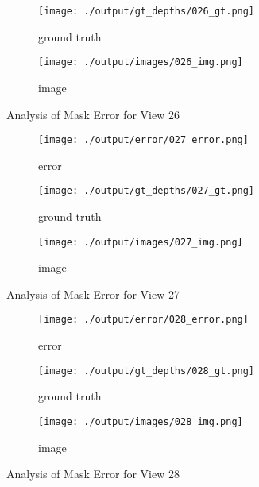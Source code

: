 \documentclass{article}
\begin{document}
\begin{figure}
\begin{subfigure}{0.3\textwidth}
		\centering
		\texttt{[image: ./output/gt\_depths/026\_gt.png]}
		\caption{ground truth}
		\label{fig:gt26}
	\end{subfigure}
	\hfill
	\centering
	\begin{subfigure}{0.3\textwidth}
		\centering
		\texttt{[image: ./output/images/026\_img.png]}
		\caption{image}
		\label{fig:img26}
	\end{subfigure}
	\hfill
	\caption{Analysis of Mask Error for View 26}
	\label{fig:error_analys26}
\end{figure}\begin{figure}
	\centering
	\begin{subfigure}{0.3\textwidth}
		\centering
		\texttt{[image: ./output/error/027\_error.png]}
		\caption{error}
		\label{fig:error27}
	\end{subfigure}
	\hfill
	\centering
	\begin{subfigure}{0.3\textwidth}
		\centering
		\texttt{[image: ./output/gt\_depths/027\_gt.png]}
		\caption{ground truth}
		\label{fig:gt27}
	\end{subfigure}
	\hfill
	\centering
	\begin{subfigure}{0.3\textwidth}
		\centering
		\texttt{[image: ./output/images/027\_img.png]}
		\caption{image}
		\label{fig:img27}
	\end{subfigure}
	\hfill
	\caption{Analysis of Mask Error for View 27}
	\label{fig:error_analys27}
\end{figure}\begin{figure}
	\centering
	\begin{subfigure}{0.3\textwidth}
		\centering
		\texttt{[image: ./output/error/028\_error.png]}
		\caption{error}
		\label{fig:error28}
	\end{subfigure}
	\hfill
	\centering
	\begin{subfigure}{0.3\textwidth}
		\centering
		\texttt{[image: ./output/gt\_depths/028\_gt.png]}
		\caption{ground truth}
		\label{fig:gt28}
	\end{subfigure}
	\hfill
	\centering
	\begin{subfigure}{0.3\textwidth}
		\centering
		\texttt{[image: ./output/images/028\_img.png]}
		\caption{image}
		\label{fig:img28}
	\end{subfigure}
	\hfill
	\caption{Analysis of Mask Error for View 28}
	\label{fig:error_analys28}
\end{figure}\begin{figure}

\end{figure}
\end{document}
